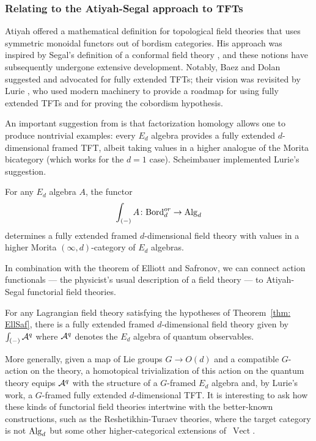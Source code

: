 \documentclass[11pt]{amsart}
\def\Vect{\operatorname{Vect}}
\begin{document}
\subsubsection{Relating to the Atiyah-Segal approach to TFTs}
\label{sec: reln to functorial TFT}

Atiyah \cite{AtiTFT} offered a mathematical definition for topological field theories that uses symmetric monoidal functors out of bordism categories.
His approach was inspired by Segal's definition of a conformal field theory \cite{SegCFT},
and these notions have subsequently undergone extensive development.
Notably, Baez and Dolan \cite{BaeDol} suggested and advocated for fully extended TFTs; 
their vision was revisited by Lurie \cite{LurieTFT}, who used modern machinery to provide a roadmap for using fully extended TFTs and for proving the cobordism hypothesis.

An important suggestion from \cite{LurieTFT} is that factorization homology allows one to produce nontrivial examples: 
every $E_d$ algebra provides a fully extended $d$-dimensional framed TFT,
albeit taking values in a higher analogue of the Morita bicategory (which works for the $d=1$ case).
Scheimbauer \cite{Scheim} implemented Lurie's suggestion.

\begin{thm}
For any $E_d$ algebra $A$, the functor
\[
\int_{(-)} A \colon {\rm Bord}^{or}_d \to {\rm Alg}_d
\]
determines a fully extended framed $d$-dimensional field theory with values in a higher Morita $(\infty,d)$-category of $E_d$ algebras.
\end{thm}

In combination with the theorem of Elliott and Safronov, we can connect action functionals --- the physicist's usual description of a field theory --- to Atiyah-Segal functorial field theories.

\begin{cor}
\label{cor: EllSaf}
For any Lagrangian field theory satisfying the hypotheses of Theorem~\ref{thm: EllSaf}, 
there is a fully extended framed $d$-dimensional field theory 
given by $\int_{(-)} \mathcal A^q$ where $\mathcal A^q$ denotes the $E_d$ algebra of quantum observables.
\end{cor}

More generally, given a map of Lie groups $G \to O(d)$ and a compatible $G$-action on the theory, 
a homotopical trivialization of this action on the quantum theory equips $\mathcal A^q$ with the structure of a $G$-framed $E_d$ algebra and, by Lurie's work, a $G$-framed fully extended $d$-dimensional TFT.
It is interesting to ask how these kinds of functorial field theories intertwine with the better-known constructions,
such as the Reshetikhin-Turaev theories, 
where the target category is not ${\rm Alg}_d$ but some other higher-categorical extensions of~$\Vect$.
\end{document}
